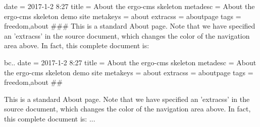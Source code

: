 date = 2017-1-2 8:27
title = About the ergo-cms skeleton
metadesc = About the ergo-cms skeleton demo site
metakeys = about
extracss = aboutpage
tags = freedom,about
###
This is a standard About page. Note that we have specified an 'extracss' in the source document, which changes the color of the navigation area above. In fact, this complete document is:

bc..
date = 2017-1-2 8:27
title = About the ergo-cms skeleton
metadesc = About the ergo-cms skeleton demo site
metakeys = about
extracss = aboutpage
tags = freedom,about
##

This is a standard About page. Note that we have specified an 'extracss' in the source document, which changes the color of the navigation area above. In fact, this complete document is: ...
